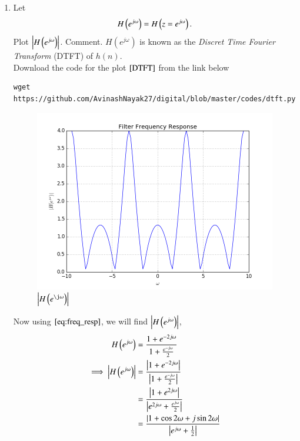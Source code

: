 \documentclass[journal,12pt,twocolumn]{IEEEtran}
\renewcommand\thesection{\arabic{section}}
\begin{document}
\begin{enumerate}[label=\thesection.\arabic*]
    \item 
      Let
      \begin{equation}
        H\left(e^{j \omega}\right) = H\left(z = e^{j \omega}\right).
      \end{equation}
      Plot $\left\vert H\left(e^{j \omega}\right)\right\vert$.  Comment.  $H(e^{j \omega})$ is known as the {\em Discret Time Fourier Transform} (DTFT) of $h(n)$.\\
    \solution
        Download the code for the plot $\ref{DTFT}$ from the link below
      \begin{lstlisting}
wget https://github.com/AvinashNayak27/digital/blob/master/codes/dtft.py
      \end{lstlisting}
      \begin{figure}[ht!]
        \includegraphics[width = \columnwidth]{Figs/dtft.png}
        \caption{$\abs{H\brak{e^{\j\omega}}}$}
        \label{DTFT}
      \end{figure} 
    Now using $\eqref{eq:freq_resp}$, we will find $\left\vert H\left(e^{j \omega}\right)\right\vert$,
     \begin{align}
      H\brak{e^{j \omega}} &= \frac{1+e^{-2j\omega}}{1 + \frac{e^{-j\omega}}{2}}\\
        \implies \abs{H\brak{e^{j \omega}}} &= \frac{\abs{1+e^{-2j\omega}}}{\abs{1 + \frac{e^{-j\omega}}{2}}}\\
                            &= \frac{\abs{1+e^{2j\omega}}}{\abs{e^{2j\omega} + \frac{e^{j\omega}}{2}}}\\
                            &= \frac{\abs{1+\cos2\omega + j\sin2\omega}}{\abs{e^{j\omega}+ \frac{1}{2}}}\\

\end{align}
\end{enumerate}
\end{document}
